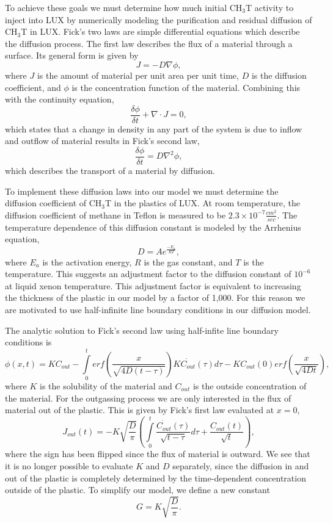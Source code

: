 \documentclass[a4paper,12pt]{article}
\begin{document}
To achieve these goals we must determine how much initial CH$_3$T activity to inject into LUX by numerically modeling the purification and residual diffusion of CH$_3$T in LUX.  Fick's two laws are simple differential equations which describe the diffusion process.  The first law describes the flux of a material through a surface.  Its general form is given by
\[J=-D \nabla \phi,\]
where $J$ is the amount of material per unit area per unit time, $D$ is the diffusion coefficient, and $\phi$ is the concentration function of the material. Combining this with the continuity equation,
\[\frac{\delta\phi}{\delta t} + \nabla \cdot J =0,\]
which states that a change in density in any part of the system is due to inflow and outflow of material results in Fick's second law,
\[\frac{\delta \phi}{\delta t} = D \nabla^2\phi,\]
which describes the transport of a material by diffusion.

To implement these diffusion laws into our model we must determine the diffusion coefficient of CH$_3$T in the plastics of LUX.  At room temperature, the diffusion coefficient of methane in Teflon is measured to be $2.3 \times 10^{-7} \frac{cm^2}{sec} $. \cite{Miyake}  The temperature dependence of this diffusion constant is modeled by the Arrhenius equation,
\[D=Ae^{\frac{-E_a}{RT}},\]
where $E_a$ is the activation energy, $R$ is the gas constant, and $T$ is the temperature.  This suggests an adjustment factor to the diffusion constant of $10^{-6}$ at liquid xenon temperature.  This adjustment factor is equivalent to increasing the thickness of the plastic in our model by a factor of 1,000.  For this reason we are motivated to use half-infinite line boundary conditions in our diffusion model.

The analytic solution to Fick's second law using half-infite line boundary conditions is
\[\phi (x,t) = KC_{out} - \int \limits_0^t erf(\frac{x}{\sqrt{4D(t - \tau)}})K\dot{C_{out}}(\tau)d\tau - KC_{out}(0)erf(\frac{x}{\sqrt{4Dt}}),\]
where $K$ is the solubility of the material and $C_{out}$ is the outside concentration of the material. \cite{Piche} For the outgassing process we are only interested in the flux of material out of the plastic.  This is given by Fick's first law evaluated at $x=0$,
\[J_{out}(t)= - K \sqrt{\frac{D}{\pi}}( \int \limits_0^t \frac{\dot{C_{out}}(\tau)}{\sqrt{t-\tau}} d \tau + \frac{C_{out}(t)}{\sqrt{t}}),\]
where the sign has been flipped since the flux of material is outward.  We see that it is no longer possible to evaluate $K$ and $D$ separately, since the diffusion in and out of the plastic is completely determined by the time-dependent concentration outside of the plastic.  To simplify our model, we define a new constant
\[ G = K \sqrt{ \frac{D}{ \pi }} .\]
\end{document}
